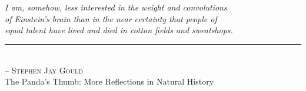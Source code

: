 \chapter*{~}


\begin{center}                      %
\vspace*{2.5in}                     %
\begin{onehalfspacing}
    \textit{
        I am, somehow, less interested in the weight and convolutions\\
        of Einstein's brain than in the near certainty that people of\\
        equal talent have lived and died in cotton fields and sweatshops.
        } \\
    
    \rule{1.5in}{0.5pt} \\       %
    
    \textsc{-- Stephen Jay Gould}\\
    \small{The Panda's Thumb: More Reflections in Natural History}
\end{onehalfspacing}
\end{center}